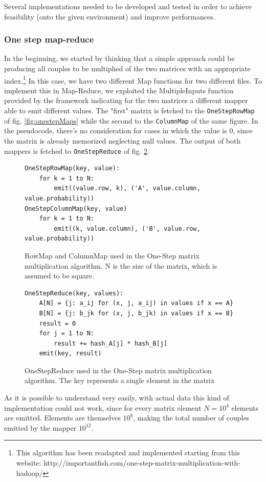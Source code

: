 Several implementations needed to be developed and tested in order to
achieve feasibility (onto the given environment) and improve performances.

\subsubsection{One step map-reduce}
In the beginning, we started by thinking that a simple approach could be producing all
couples to be multiplied of the two matrices with an appropriate index.\footnote{This algorithm
has been readapted and implemented starting from this website: http://importantfish.com/one-step-matrix-multiplication-with-hadoop/}
In this case, we have two different Map functions for two different files. To implement this in Map-Reduce, we exploited
the MultipleInputs function provided by the framework indicating for the two matrices a different mapper able
to emit different values.
The "first" matrix is fetched to the \texttt{OneStepRowMap} of fig. \ref{fig:onestepMaps} while the second to the \texttt{ColumnMap} of the same figure. In the pseudocode, there's no consideration for cases in which the value is 0, since the
matrix is already memorized neglecting null values.
The output of both mappers is fetched to \texttt{OneStepReduce} of fig. \ref{fig:onestepReduce}.
\begin{figure}
\begin{verbatim}
OneStepRowMap(key, value):
    for k = 1 to N:
        emit((value.row, k), ('A', value.column, value.probability))
OneStepColumnMap(key, value)
    for k = 1 to N:
        emit((k, value.column), ('B', value.row, value.probability))
\end{verbatim}
\caption{RowMap and ColumnMap used in the One-Step matrix multiplication algorithm. N is the size of the matrix, which is assumed to be square.}
\label{fig:onestep}
\end{figure}

\begin{figure}
\begin{verbatim}
OneStepReduce(key, values):
    A[N] = {j: a_ij for (x, j, a_ij) in values if x == A}
    B[N] = {j: b_jk for (x, j, b_jk) in values if x == B}
    result = 0
    for j = 1 to N:
        result += hash_A[j] * hash_B[j]
    emit(key, result)
\end{verbatim}
\caption{OneStepReduce used in the One-Step matrix multiplication algorithm. The key represents a single element in the matrix}
\label{fig:onestepReduce}
\end{figure}
As it is possible to understand very easily, with actual data this kind of implementation could not
work, since for every matrix element $N=10^4$ elements are emitted. Elements
are themselves $10^8$, making the total number of couples emitted by the mapper $10^12$.

